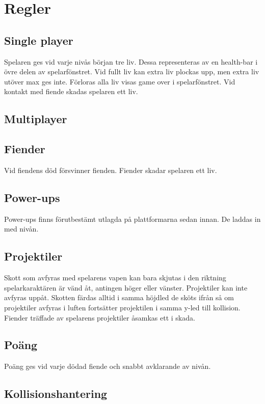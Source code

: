 \documentclass{TDP005mall}
\begin{document}
\section{Regler}%

\subsection{Single player}
Spelaren ges vid varje nivås början tre liv. Dessa representeras av en health-bar i övre delen av spelarfönstret. Vid fullt liv kan extra liv plockas upp, men extra liv utöver max ges inte. Förloras alla liv visas game over i spelarfönstret. Vid kontakt med fiende skadas spelaren ett liv.

\subsection{Multiplayer}


\subsection{Fiender}
Vid fiendens död försvinner fienden. Fiender skadar spelaren ett liv.

\subsection{Power-ups}
Power-ups finns förutbestämt utlagda på plattformarna sedan innan. De laddas in med nivån.

\subsection{Projektiler}
Skott som avfyras med spelarens vapen kan bara skjutas i den riktning spelarkaraktären är vänd åt, antingen höger eller vänster. Projektiler kan inte avfyras uppåt. Skotten färdas alltid i samma höjdled de sköts ifrån så om projektiler avfyras i luften fortsätter projektilen i samma y-led till kollision. Fiender träffade av spelarens projektiler åsamkas ett i skada.

\subsection{Poäng}
Poäng ges vid varje dödad fiende och snabbt avklarande av nivån.

\subsection{Kollisionshantering}
\end{document}
